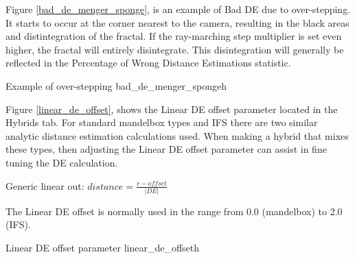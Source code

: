 Figure \ref{bad_de_menger_sponge}, is an example of Bad DE due to over-stepping. It starts to occur at the corner nearest to the camera, resulting in the black areas and distintegration of the fractal. If the ray-marching step multiplier is set even higher, the fractal will entirely disintegrate. This disintegration will generally be reflected in the Percentage of Wrong Distance Estimations statistic.

{Example of over-stepping}
{bad_de_menger_sponge}{h}

Figure \ref{linear_de_offset}, shows the Linear DE offset parameter located in the Hybrids tab.
For standard mandelbox types and IFS there are two similar analytic distance estimation calculations used. When making a hybrid that mixes these types, then adjusting the Linear DE offset parameter can assist in fine tuning the DE calculation.

Generic  linear out: $ distance = \frac{r - offset}{\lvert DE \rvert} $

The Linear DE offset is normally used in the range from 0.0 (mandelbox) to 2.0 (IFS).
 
{Linear DE offset parameter}
{linear_de_offset}{h}

